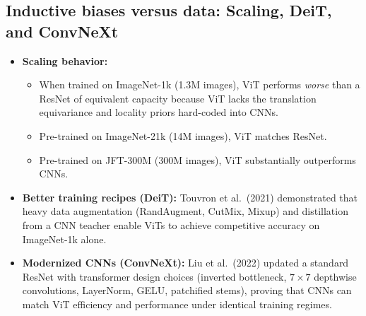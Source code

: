 \documentclass[11pt,a4paper]{article}
\newcommand{\slides}[1]{\par\nopagebreak\noindent{\normalfont\small\emph{(slides #1)}}\par\nopagebreak\vspace{2pt}}
\theoremstyle{definition}
\theoremstyle{plain}
\begin{document}
\subsection{Inductive biases versus data: Scaling, DeiT, and ConvNeXt}\slides{81 / 84}
\begin{itemize}
\item \textbf{Scaling behavior:}
  \begin{itemize}[nosep]
  \item When trained on ImageNet-1k (1.3M images), ViT performs \emph{worse} than a ResNet of equivalent capacity because ViT lacks the translation equivariance and locality priors hard-coded into CNNs.
  \item Pre-trained on ImageNet-21k (14M images), ViT matches ResNet.
  \item Pre-trained on JFT-300M (300M images), ViT substantially outperforms CNNs.
  \end{itemize}
\item \textbf{Better training recipes (DeiT):} Touvron et al.\ (2021) demonstrated that heavy data augmentation (RandAugment, CutMix, Mixup) and distillation from a CNN teacher enable ViTs to achieve competitive accuracy on ImageNet-1k alone.
\item \textbf{Modernized CNNs (ConvNeXt):} Liu et al.\ (2022) updated a standard ResNet with transformer design choices (inverted bottleneck, $7 \times 7$ depthwise convolutions, LayerNorm, GELU, patchified stems), proving that CNNs can match ViT efficiency and performance under identical training regimes.
\end{itemize}
\end{document}
